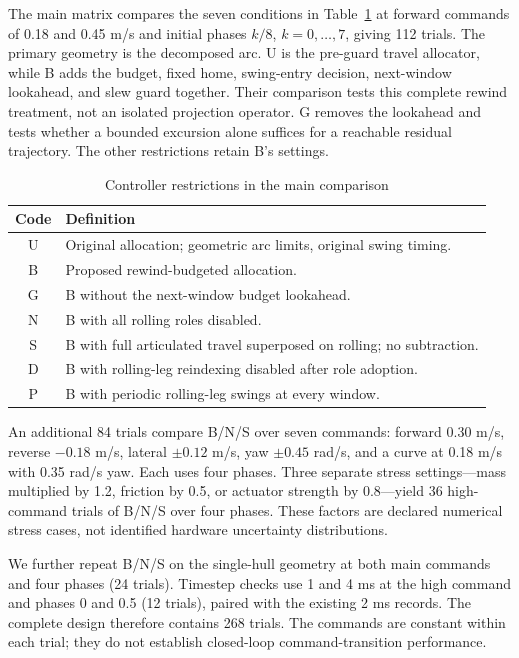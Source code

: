 \documentclass[letterpaper,10pt,conference]{ieeeconf}
\begin{document}
The main matrix compares the seven conditions in Table~\ref{tab:conditions} at forward commands of 0.18 and 0.45 m/s and initial phases $k/8$, $k=0,\ldots,7$, giving 112 trials. The primary geometry is the decomposed arc. U is the pre-guard travel allocator, while B adds the budget, fixed home, swing-entry decision, next-window lookahead, and slew guard together. Their comparison tests this complete rewind treatment, not an isolated projection operator. G removes the lookahead and tests whether a bounded excursion alone suffices for a reachable residual trajectory. The other restrictions retain B's settings.

\begin{table}[t]
\caption{Controller restrictions in the main comparison}
\label{tab:conditions}\centering\small
\begin{tabular}{cp{6.7cm}}\toprule
Code & Definition\\\midrule
U & Original allocation; geometric arc limits, original swing timing.\\
B & Proposed rewind-budgeted allocation.\\
G & B without the next-window budget lookahead.\\
N & B with all rolling roles disabled.\\
S & B with full articulated travel superposed on rolling; no subtraction.\\
D & B with rolling-leg reindexing disabled after role adoption.\\
P & B with periodic rolling-leg swings at every window.\\\bottomrule
\end{tabular}
\end{table}

An additional 84 trials compare B/N/S over seven commands: forward 0.30 m/s, reverse $-0.18$ m/s, lateral $\pm0.12$ m/s, yaw $\pm0.45$ rad/s, and a curve at 0.18 m/s with 0.35 rad/s yaw. Each uses four phases. Three separate stress settings---mass multiplied by 1.2, friction by 0.5, or actuator strength by 0.8---yield 36 high-command trials of B/N/S over four phases. These factors are declared numerical stress cases, not identified hardware uncertainty distributions.

We further repeat B/N/S on the single-hull geometry at both main commands and four phases (24 trials). Timestep checks use 1 and 4 ms at the high command and phases 0 and 0.5 (12 trials), paired with the existing 2 ms records. The complete design therefore contains 268 trials. The commands are constant within each trial; they do not establish closed-loop command-transition performance.
\end{document}

